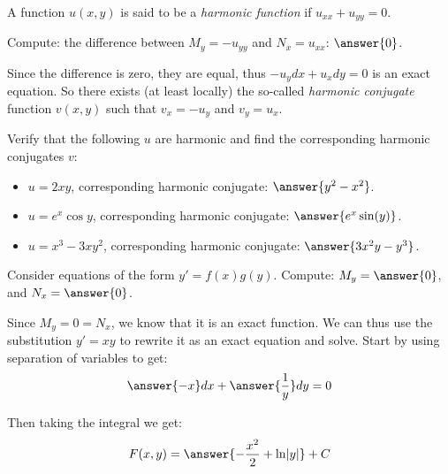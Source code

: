 \documentclass{ximera}
\begin{document}
\begin{exercise}
    A function $u(x,y)$ is said to be a \emph{harmonic function} if $u_{xx} + u_{yy} = 0$.
    
    Compute: the difference between $M_y = -u_{yy}$ and $N_x = u_{xx}$: $\answer{0}$.
    \begin{problem}
        Since the difference is zero, they are equal, thus $-u_y dx + u_x dy = 0$ is an exact equation.  So there exists (at least locally) the so-called \emph{harmonic conjugate} function $v(x,y)$ such that $v_x = -u_y$ and $v_y = u_x$.
        
        Verify that the following $u$ are harmonic and find the corresponding harmonic conjugates $v$:
        \begin{itemize}
            \item $u = 2xy$, corresponding harmonic conjugate: $\answer{y^2 - x^2}$.
            \item $u = e^x \cos y$, corresponding harmonic conjugate: $\answer{e^{x}\sin(y)}$.
            \item $u = x^3-3xy^2$, corresponding harmonic conjugate: $\answer{3x^2y - y^3}$.
        \end{itemize}
    \end{problem}
\end{exercise}

\begin{exercise}\label{ex:separableExact}%
    Consider equations of the form $y' = f(x)g(y)$. Compute: $M_y = \answer{0}$, and $N_x = \answer{0}$.
    \begin{problem}
        Since $M_y = 0 = N_x$, we know that it is an exact function. We can thus use the substitution $y' = xy$ to rewrite it as an exact equation and solve. Start by using separation of variables to get:
        \[
            \answer{-x }dx + \answer{\frac{1}{y}} dy = 0
        \]
        \begin{problem}
            Then taking the integral we get:
            \[
                F(x,y) = \answer{-\frac{x^2}{2} + \ln \lvert y \rvert} + C
            \]
        \end{problem}
    \end{problem}
\end{exercise}

\end{document}
